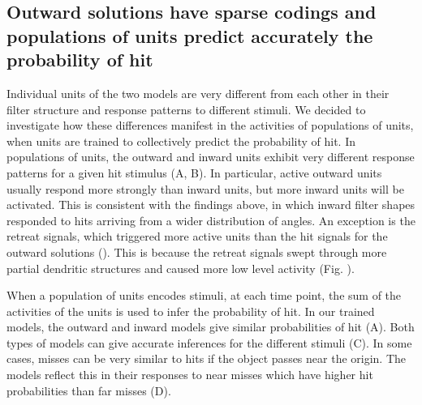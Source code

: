 \documentclass[pdftex,9pt,lineno]{elife}
\begin{document}
\subsection{Outward solutions have sparse codings and populations of units predict accurately the probability of hit}

Individual units of the two models are very different from each other in their filter structure and response patterns to different stimuli. We decided to investigate how these differences manifest in the activities of populations of units, when units are trained to collectively predict the probability of hit. In populations of units, the outward and inward units exhibit very different response patterns for a given hit stimulus (A, B). In particular, active outward units usually respond more strongly than inward units, but more inward units will be activated. This is consistent with the findings above, in which inward filter shapes responded to hits arriving from a wider distribution of angles. An exception is the retreat signals, which triggered more active units than the hit signals for the outward solutions (). This is because the retreat signals swept through more partial dendritic structures and caused more low level activity (Fig. ).

When a population of units encodes stimuli, at each time point, the sum of the activities of the units is used to infer the probability of hit. In our trained models, the outward and inward models give similar probabilities of hit (A). Both types of models can give accurate inferences for the different stimuli (C). In some cases, misses can be very similar to hits if the object passes near the origin. The models reflect this in their responses to near misses which have higher hit probabilities than far misses (D).
\end{document}

